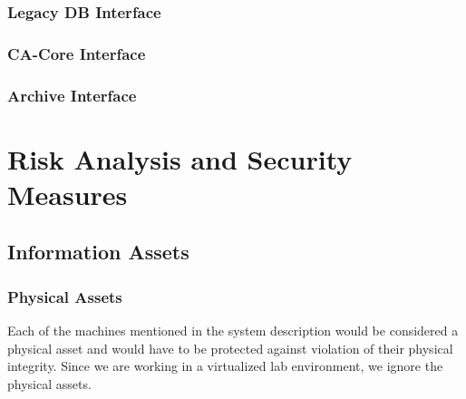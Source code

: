 \documentclass{article}
\begin{document}
\subsubsection{Legacy DB Interface}

\subsubsection{CA-Core Interface}

\subsubsection{Archive Interface}


















\section{Risk Analysis and Security Measures}

\subsection{Information Assets}

\subsubsection{Physical Assets}
Each of the machines mentioned in the system description would be considered a physical asset and would have to be protected against violation of their physical integrity. Since we are working in a virtualized lab environment, we ignore the physical assets.
\end{document}
